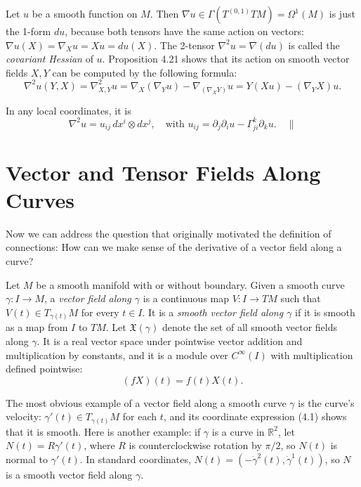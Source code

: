 \begin{example}
\label{ex:covariant-hessian}
Let $u$ be a smooth function on $M$. Then $\nabla u \in \Gamma(T^{(0,1)}TM) = \Omega^1(M)$ is just the 1-form $du$, because both tensors have the same action on vectors: $\nabla u(X) = \nabla_X u = Xu = du(X)$. The 2-tensor $\nabla^2 u = \nabla(du)$ is called the \emph{covariant Hessian} of $u$. Proposition 4.21 shows that its action on smooth vector fields $X, Y$ can be computed by the following formula:
\[
\nabla^2 u(Y,X) = \nabla^2_{X,Y}u = \nabla_X(\nabla_Y u) - \nabla_{(\nabla_X Y)}u = Y(Xu) - (\nabla_Y X)u.
\]

In any local coordinates, it is
\[
\nabla^2 u = u_{ij}\, dx^i \otimes dx^j, \quad \text{with } u_{ij} = \partial_j \partial_i u - \Gamma^k_{ji} \partial_k u. \quad \parallel
\]
\end{example}

\section{Vector and Tensor Fields Along Curves}

Now we can address the question that originally motivated the definition of connections: How can we make sense of the derivative of a vector field along a curve?

Let $M$ be a smooth manifold with or without boundary. Given a smooth curve $\gamma: I \to M$, a \emph{vector field along $\gamma$} is a continuous map $V: I \to TM$ such that $V(t) \in T_{\gamma(t)}M$ for every $t \in I$. It is a \emph{smooth vector field along $\gamma$} if it is smooth as a map from $I$ to $TM$. Let $\mathfrak{X}(\gamma)$ denote the set of all smooth vector fields along $\gamma$. It is a real vector space under pointwise vector addition and multiplication by constants, and it is a module over $C^\infty(I)$ with multiplication defined pointwise:
\[
(fX)(t) = f(t)X(t).
\]

The most obvious example of a vector field along a smooth curve $\gamma$ is the curve's velocity: $\gamma'(t) \in T_{\gamma(t)}M$ for each $t$, and its coordinate expression (4.1) shows that it is smooth. Here is another example: if $\gamma$ is a curve in $\mathbb{R}^2$, let $N(t) = R\gamma'(t)$, where $R$ is counterclockwise rotation by $\pi/2$, so $N(t)$ is normal to $\gamma'(t)$. In standard coordinates, $N(t) = (-\dot{\gamma}^2(t), \dot{\gamma}^1(t))$, so $N$ is a smooth vector field along $\gamma$.

